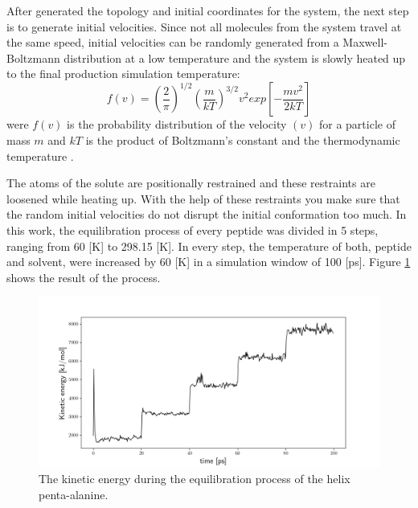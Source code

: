After generated the topology and initial coordinates for the system, the next step is to generate initial velocities. Since not all molecules from the system travel at the same speed, initial velocities can be randomly generated from a Maxwell-Boltzmann distribution at a low temperature and the system is slowly heated up to the final production simulation temperature:
\begin{equation}
    f(v)=\left ( {\frac{2}{\pi}}\right )^{1/2} \left ( \frac{m}{kT}\right )^{3/2} v^2exp\left [ -\frac{mv^2}{2kT} \right ]
    \label{eq:thermalization}
\end{equation}
were $f(v)$ is the probability distribution of the velocity $(v)$ for a particle of mass $m$ and $kT$ is the product of Boltzmann’s constant and the thermodynamic temperature \cite{muller2013basics}.

The atoms of the solute are positionally restrained and these restraints are loosened while heating up. With the help of these restraints you make sure that the random initial velocities do not disrupt the initial conformation too much. In this work, the equilibration process of every peptide was divided in 5 steps, ranging from 60 [K] to 298.15 [K]. In every step, the temperature of both, peptide and solvent, were increased by 60 [K] in a simulation window of 100 [ps]. Figure \ref{fig:totkin} shows the result of the process. 

\begin{figure}[h]
    \centering
    \includegraphics[scale=0.65]{Figures/Chapter_5/totkin.png}
    \caption{The kinetic energy during the equilibration process of the helix penta-alanine.}
    \label{fig:totkin}
\end{figure}





